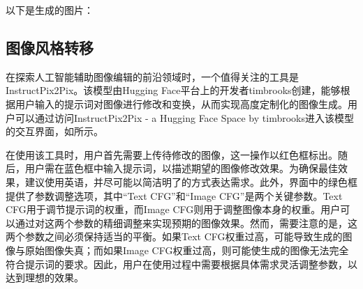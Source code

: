 
\begin{gptbox}
\footnotesize{以下是生成的图片：}
\fig[H]{
    \texttt{[image: gc]}
}
\end{gptbox}


\subsection{图像风格转移}

在探索人工智能辅助图像编辑的前沿领域时，一个值得关注的工具是InstructPix2Pix。该模型由Hugging Face平台上的开发者timbrooks创建，能够根据用户输入的提示词对图像进行修改和变换，从而实现高度定制化的图像生成。用户可以通过访问InstructPix2Pix - a Hugging Face Space by timbrooks进入该模型的交互界面，如所示。

在使用该工具时，用户首先需要上传待修改的图像，这一操作以红色框标出。随后，用户需在蓝色框中输入提示词，以描述期望的图像修改效果。为确保最佳效果，建议使用英语，并尽可能以简洁明了的方式表达需求。此外，界面中的绿色框提供了参数调整选项，其中“Text CFG”和“Image CFG”是两个关键参数。Text CFG用于调节提示词的权重，而Image CFG则用于调整图像本身的权重。用户可以通过对这两个参数的精细调整来实现预期的图像效果。然而，需要注意的是，这两个参数之间必须保持适当的平衡。如果Text CFG权重过高，可能导致生成的图像与原始图像失真；而如果Image CFG权重过高，则可能使生成的图像无法完全符合提示词的要求。因此，用户在使用过程中需要根据具体需求灵活调整参数，以达到理想的效果。


